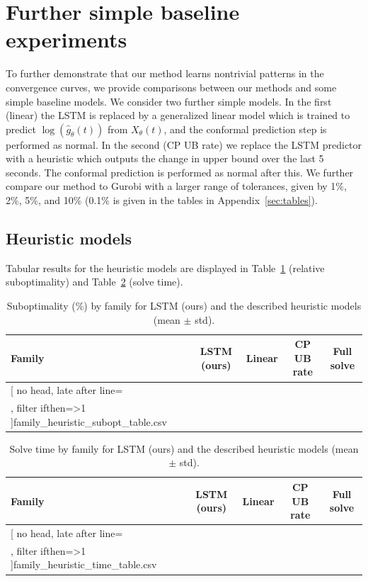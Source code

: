 \documentclass[12pt]{article}
\theoremstyle{definition}
\theoremstyle{remark}
\newcommand{\param}{\theta}
\newcommand{\covars}{X}
\newcommand{\predgap}{\hat{g}}
\newcommand{\change}[1]{#1}
\newcommand{\param}{\theta}
\newcommand{\covars}{X}
\newcommand{\predgap}{\hat{g}}
\newcommand{\change}[1]{#1}
\theoremstyle{plain}
\theoremstyle{definition}
\theoremstyle{remark}
\begin{document}
\change{
\section{Further simple baseline experiments} \label{appendix:moreexperiments}
To further demonstrate that our method learns nontrivial patterns in the convergence curves, we provide comparisons between our methods and some simple baseline models.
We consider two further simple models.
In the first (linear) the LSTM is replaced by a generalized linear model which is trained to predict $\log(\predgap_\param(t))$ from $\covars_\param(t)$, and the conformal prediction step is performed as normal.
In the second (CP UB rate) we replace the LSTM predictor with a heuristic which outputs the change in upper bound over the last 5 seconds. The conformal prediction is performed as normal after this.
We further compare our method to Gurobi with a larger range of tolerances, given by 1\%, 2\%, 5\%, and 10\% (0.1\% is given in the tables in Appendix~\ref{sec:tables}).
\subsection{Heuristic models}
Tabular results for the heuristic models are displayed in Table~\ref{tab:heur_subopt} (relative suboptimality) and Table~\ref{tab:heur_time} (solve time).
\begin{table}[h]
\small
\centering
\caption{Suboptimality (\%) by family for LSTM (ours) and the described heuristic models (mean $\pm$ std).}
\label{tab:heur_subopt}
\begin{tabular}{lcccc}
\toprule
Family & LSTM (ours) & Linear & CP UB rate & Full solve \\
\midrule
\csvreader[
  no head,
  late after line=\\,
  filter ifthen={\value{csvinputline}>1}
]{family_heuristic_subopt_table.csv}{}%
{\csvcoli & \csvcolii & \csvcoliii & \csvcoliv & \csvcolv}
\bottomrule
\end{tabular}
\end{table}
\begin{table}[h]
\small
\centering
\caption{Solve time by family for LSTM (ours) and the described heuristic models (mean $\pm$ std).}
\label{tab:heur_time}
\begin{tabular}{lcccc}
\toprule
Family & LSTM (ours) & Linear & CP UB rate & Full solve \\
\midrule
\csvreader[
  no head,
  late after line=\\,
  filter ifthen={\value{csvinputline}>1}
]{family_heuristic_time_table.csv}{}%
{\csvcoli & \csvcolii & \csvcoliii & \csvcoliv & \csvcolv}
\bottomrule
\end{tabular}
\end{table}
%
}
\end{document}
